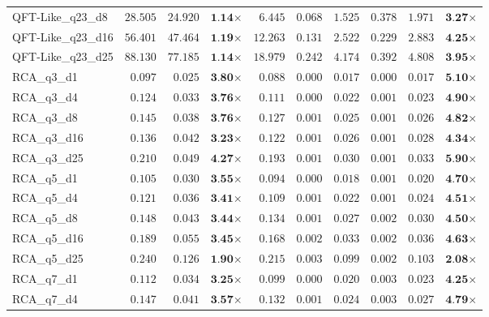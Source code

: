 \begin{table*}[t]
{\begin{tabular}{| l || r r c || r r r r r c |}
QFT-Like\_q23\_d8 & $28.505$ & $24.920$ & $\textbf{1.14}$$\times$ & $6.445$ & $0.068$ & $1.525$ & $0.378$ & $1.971$ & $\textbf{3.27}$$\times$ \\
QFT-Like\_q23\_d16 & $56.401$ & $47.464$ & $\textbf{1.19}$$\times$ & $12.263$ & $0.131$ & $2.522$ & $0.229$ & $2.883$ & $\textbf{4.25}$$\times$ \\
QFT-Like\_q23\_d25 & $88.130$ & $77.185$ & $\textbf{1.14}$$\times$ & $18.979$ & $0.242$ & $4.174$ & $0.392$ & $4.808$ & $\textbf{3.95}$$\times$ \\
RCA\_q3\_d1 & $0.097$ & $0.025$ & $\textbf{3.80}$$\times$ & $0.088$ & $0.000$ & $0.017$ & $0.000$ & $0.017$ & $\textbf{5.10}$$\times$ \\
RCA\_q3\_d4 & $0.124$ & $0.033$ & $\textbf{3.76}$$\times$ & $0.111$ & $0.000$ & $0.022$ & $0.001$ & $0.023$ & $\textbf{4.90}$$\times$ \\
RCA\_q3\_d8 & $0.145$ & $0.038$ & $\textbf{3.76}$$\times$ & $0.127$ & $0.001$ & $0.025$ & $0.001$ & $0.026$ & $\textbf{4.82}$$\times$ \\
RCA\_q3\_d16 & $0.136$ & $0.042$ & $\textbf{3.23}$$\times$ & $0.122$ & $0.001$ & $0.026$ & $0.001$ & $0.028$ & $\textbf{4.34}$$\times$ \\
RCA\_q3\_d25 & $0.210$ & $0.049$ & $\textbf{4.27}$$\times$ & $0.193$ & $0.001$ & $0.030$ & $0.001$ & $0.033$ & $\textbf{5.90}$$\times$ \\
RCA\_q5\_d1 & $0.105$ & $0.030$ & $\textbf{3.55}$$\times$ & $0.094$ & $0.000$ & $0.018$ & $0.001$ & $0.020$ & $\textbf{4.70}$$\times$ \\
RCA\_q5\_d4 & $0.121$ & $0.036$ & $\textbf{3.41}$$\times$ & $0.109$ & $0.001$ & $0.022$ & $0.001$ & $0.024$ & $\textbf{4.51}$$\times$ \\
RCA\_q5\_d8 & $0.148$ & $0.043$ & $\textbf{3.44}$$\times$ & $0.134$ & $0.001$ & $0.027$ & $0.002$ & $0.030$ & $\textbf{4.50}$$\times$ \\
RCA\_q5\_d16 & $0.189$ & $0.055$ & $\textbf{3.45}$$\times$ & $0.168$ & $0.002$ & $0.033$ & $0.002$ & $0.036$ & $\textbf{4.63}$$\times$ \\
RCA\_q5\_d25 & $0.240$ & $0.126$ & $\textbf{1.90}$$\times$ & $0.215$ & $0.003$ & $0.099$ & $0.002$ & $0.103$ & $\textbf{2.08}$$\times$ \\
RCA\_q7\_d1 & $0.112$ & $0.034$ & $\textbf{3.25}$$\times$ & $0.099$ & $0.000$ & $0.020$ & $0.003$ & $0.023$ & $\textbf{4.25}$$\times$ \\
RCA\_q7\_d4 & $0.147$ & $0.041$ & $\textbf{3.57}$$\times$ & $0.132$ & $0.001$ & $0.024$ & $0.003$ & $0.027$ & $\textbf{4.79}$$\times$ \\

\end{tabular}}
\end{table*}
